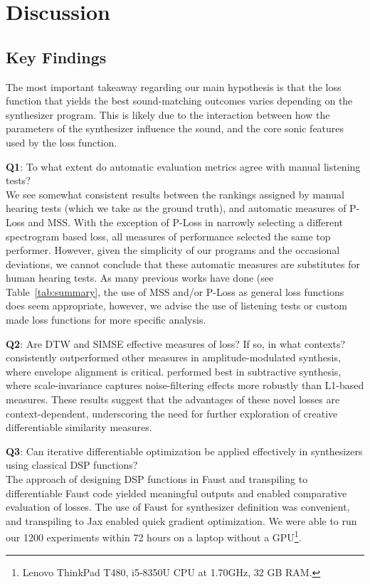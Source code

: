 
\section{Discussion}
\subsection{Key Findings}
The most important takeaway regarding our main hypothesis is that the loss function that yields the best sound-matching outcomes varies depending on the synthesizer program. This is likely due to the interaction between how the parameters of the synthesizer influence the sound, and the core sonic features used by the loss function.

\textbf{Q1}: To what extent do automatic evaluation metrics agree with manual listening tests? 
\\We see somewhat consistent results between the rankings assigned by manual hearing tests (which we take as the ground truth), and automatic measures of P-Loss and MSS. With the exception of P-Loss in \BPNoise{} narrowly selecting a different spectrogram based loss, all measures of performance selected the same top performer. However, given the simplicity of our programs and the occasional deviations, we cannot conclude that these automatic measures are substitutes for human hearing tests. As many previous works have done (see Table~\ref{tab:summary}, the use of MSS and/or P-Loss as general loss functions does seem appropriate, however, we advise the use of listening tests or custom made loss functions for more specific analysis. 

\textbf{Q2}: Are DTW and SIMSE effective measures of loss? If so, in what contexts?\\
\DTWEnv{} consistently outperformed other measures in amplitude-modulated synthesis, where envelope alignment is critical. \SIMSESpec{} performed best in subtractive synthesis, where scale-invariance captures noise-filtering effects more robustly than L1-based measures. These results suggest that the advantages of these novel losses are context-dependent, underscoring the need for further exploration of creative differentiable similarity measures. 


\textbf{Q3}: Can iterative differentiable optimization be applied effectively in synthesizers using classical DSP functions? \\
The approach of designing DSP functions in Faust and transpiling to differentiable Faust code yielded meaningful outputs and enabled comparative evaluation of losses. The use of Faust for synthesizer definition was convenient, and transpiling to Jax enabled quick gradient optimization. We were able to run our 1200 experiments within 72 hours on a laptop without a GPU\footnote{Lenovo ThinkPad T480, i5-8350U CPU at 1.70GHz, 32 GB RAM.}.

